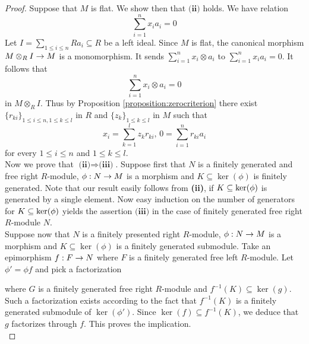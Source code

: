 \begin{proof}
Suppose that $M$ is flat. We show then that $\textbf{(ii)}$ holds. We have relation
$$\sum^n_{i=1}x_ia_{i}=0$$
Let $I=\sum_{1\leq i\leq n}Ra_{i}\subseteq R$ be a left ideal. Since $M$ is flat, the canonical morphism $M\otimes_RI\rightarrow M$ is a monomorphism. It sends $\sum_{i=1}^nx_i\otimes a_i$ to $\sum_{i=1}^nx_ia_i=0$. It follows that 
$$\sum^n_{i=1}x_i\otimes a_i=0$$
in $M\otimes_RI$. Thus by Proposition \ref{proposition:zerocriterion} there exist $\{r_{ki}\}_{1\leq i\leq n,1\leq k\leq l}$ in $R$ and $\{z_k\}_{1\leq k\leq l}$ in $M$ such that
$$x_i=\sum^l_{k=1}z_kr_{ki},\,0=\sum^n_{i=1}r_{ki}a_i$$
for every  $1\leq i \leq n$ and $1\leq k\leq l$.\\
Now we prove that $\textbf{(ii)}\Rightarrow \textbf{(iii)}$. Suppose first that $N$ is a finitely generated and free right $R$-module, $\phi:N\rightarrow M$ is a morphism and $K\subseteq \ker(\phi)$ is finitely generated. Note that our result easily follows from \textbf{(ii)}, if $K\subseteq \mathrm{ker}(\phi)$ is generated by a single element. Now easy induction on the number of generators for $K\subseteq \mathrm{ker}(\phi)$ yields the assertion $\textbf{(iii)}$ in the case of finitely generated free right $R$-module $N$.\\
Suppose now that $N$ is a finitely presented right $R$-module, $\phi:N\rightarrow M$ is a morphism and $K\subseteq \ker(\phi)$ is a finitely generated submodule. Take an epimorphism $f:F\rightarrow N$ where $F$ is a finitely generated free left $R$-module. Let $\phi'=\phi f$ and pick a factorization
\begin{center}
\end{center}
where $G$ is a finitely generated free right $R$-module and $f^{-1}(K)\subseteq \ker(g)$. Such a factorization exists according to the fact that $f^{-1}(K)$ is a finitely generated submodule of $\ker(\phi')$. Since $\ker(f)\subseteq f^{-1}(K)$, we deduce that $g$ factorizes through $f$. This proves the implication. \\

\end{proof}
